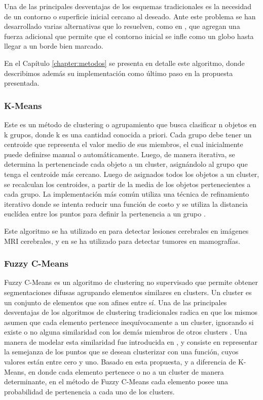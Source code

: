 Una de las principales desventajas de los esquemas tradicionales es la necesidad de un contorno o superficie inicial cercano al deseado. Ante este problema se han desarrollado varias alternativas que lo resuelven, como en \citep{cohen1991active}, que agregan una fuerza adicional que permite que el contorno inicial se infle como un globo hasta llegar a un borde bien marcado.

En el Capítulo \ref{chapter:metodos} se presenta en detalle este algoritmo, donde describimos además su implementación como último paso en la propuesta presentada.

\subsubsection{K-Means}
Este es un método de clustering o agrupamiento que busca clasificar n objetos en k grupos, donde k es una cantidad conocida a priori. Cada grupo debe tener un centroide que representa el valor medio de sus miembros, el cual inicialmente puede definirse manual o automáticamente. Luego, de manera iterativa, se determina la pertenenciade cada objeto a un cluster, asignándolo al grupo que tenga el centroide más cercano. Luego de asignados todos los objetos a un cluster, se recalculan los centroides, a partir de la media de los objetos pertenecientes a cada grupo. La implementación más común utiliza una técnica de refinamiento iterativo donde se intenta reducir una función de costo y se utiliza la distancia euclídea entre los puntos para definir la pertenencia a un grupo \citep{macqueen1967some}.
 
Este algoritmo se ha utilizado en \citep{juang2010mri} para detectar lesiones cerebrales en imágenes MRI cerebrales, y en \citep{dalmiya2012application} se ha utilizado  para detectar tumores en mamografías.

\subsubsection{Fuzzy C-Means}
Fuzzy C-Means es un algoritmo de clustering no supervisado que permite obtener segmentaciones difusas agrupando elementos similares en clusters. Un cluster es un conjunto de elementos que son afines entre sí. Una de las principales desventajas de los algoritmos de clustering tradicionales radica en que los mismos asumen que cada elemento pertenece inequívocamente a un cluster, ignorando si existe o no alguna similaridad con los demás miembros de otros clusters \citep{full1982fuzzy}. Una manera de modelar esta similaridad fue introducida en \citep{zadeh1965fuzzy}, y consiste en representar la semejanza de los puntos que se desean clusterizar con una función, cuyos valores están entre cero y uno. Basado en esta propuesta, y a diferencia de K-Means, en donde cada elemento pertenece o no a un cluster de manera determinante, en el método de Fuzzy C-Means cada elemento posee una probabilidad de pertenencia a cada uno de los clusters.

